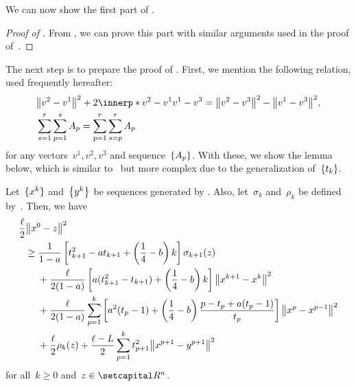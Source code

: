 \documentclass[../main]{subfiles}
\begin{document}
We can now show the first part of .
\begin{proof}[Proof of ]
    From , we can prove this part with similar arguments used in the proof of~\cite[Theorem~5.1]{Tanabe2022a}.
\end{proof}

The next step is to prepare the proof of .
First, we mention the following relation, used frequently hereafter:
\begin{align}
        &\norm*{v^2 - v^1}^2 + 2 \innerp*{v^2 - v^1}{v^1 - v^3} = \norm*{ v^2 - v^3 }^2 - \norm*{v^1 - v^3}^2 , \label{eq:Pythagoras} \\
        &\sum_{s=1}^r \sum_{p=1}^s A_p = \sum_{p=1}^r \sum_{s=p}^r A_p \label{eq:change sum}
\end{align}
for any vectors~$v^1, v^2, v^3$ and sequence~$\set*{A_p}$.
With these, we show the lemma below, which is similar to~\cite[Lemma 5.2]{Tanabe2022a} but more complex due to the generalization of~$\set{t_k}$.
\begin{lemma} 
    Let~$\set{x^k}$ and~$\set*{y^k}$ be sequences generated by .
    Also, let~$\sigma_k$ and~$\rho_k$ be defined by~.
    Then, we have
    \begin{align}
        \MoveEqLeft \frac{\ell}{2} \norm*{x^0 - z}^2 \\
        \ge{}& \frac{1}{1 - a} \left[ t_{k + 1}^2 - a t_{k + 1} + \left( \frac{1}{4} - b \right) k \right] \sigma_{k + 1}(z) \\
        &+ \frac{\ell}{2 (1 - a)} \left[ a (t_{k + 1}^2 - t_{k + 1}) + \left( \frac{1}{4} - b \right) k \right] \norm*{x^{k + 1} - x^k}^2 \\
        &+ \frac{\ell}{2 (1 - a)} \sum_{p = 1}^{k} \left[ a^2 (t_p - 1) + \left( \frac{1}{4} - b \right) \frac{p - t_p + a(t_p - 1)}{t_p} \right] \norm*{x^p - x^{p - 1}}^2 \\
        &+ \frac{\ell}{2} \rho_k(z) + \frac{\ell - L}{2} \sum_{p = 1}^{k} t_{p + 1}^2 \norm*{x^{p + 1} - y^{p + 1}}^2
    \end{align}
    for all~$k \ge 0$ and~$z \in \setR^n$.
\end{lemma}
\end{document}
